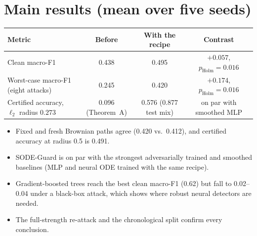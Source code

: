 \documentclass[11pt]{article}
\begin{document}
\section*{Main results (mean over five seeds)}
\begin{center}\small
\begin{tabular}{lccc}
\toprule
Metric & Before & With the recipe & Contrast \\
\midrule
Clean macro-F1 & 0.438 & 0.495 & $+0.057$, $p_{\mathrm{Holm}}=0.016$\\
Worst-case macro-F1 (eight attacks) & 0.245 & 0.420 & $+0.174$, $p_{\mathrm{Holm}}=0.016$\\
Certified accuracy, $\ell_2$ radius $0.273$ & 0.096 (Theorem~A) & 0.576 (0.877 test mix) & on par with smoothed MLP\\
\bottomrule
\end{tabular}
\end{center}
\begin{itemize}
\item Fixed and fresh Brownian paths agree (0.420 vs.\ 0.412), and certified
accuracy at radius 0.5 is 0.491.
\item SODE-Guard is on par with the strongest adversarially trained and smoothed
baselines (MLP and neural ODE trained with the same recipe).
\item Gradient-boosted trees reach the best clean macro-F1 (0.62) but fall to
0.02--0.04 under a black-box attack, which shows where robust neural detectors
are needed.
\item The full-strength re-attack and the chronological split confirm every
conclusion.
\end{itemize}
\end{document}
